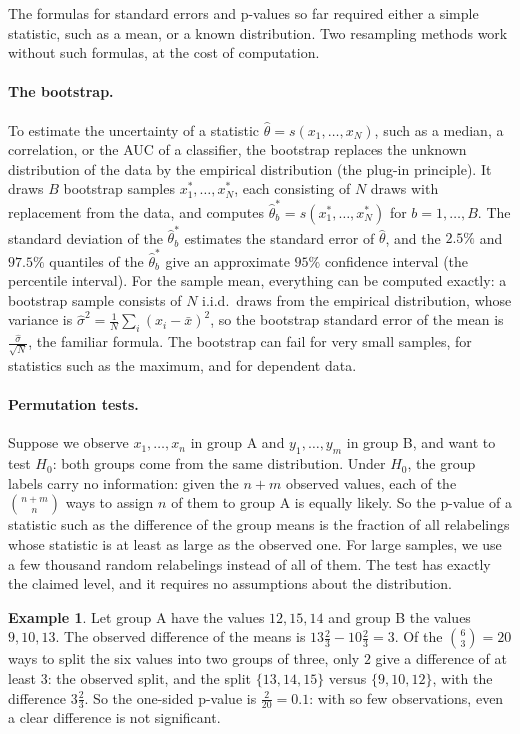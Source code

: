 \documentclass[11pt]{article}
\theoremstyle{definition}
\newtheorem{example}[definition]{Example}
\theoremstyle{plain}
\theoremstyle{remark}
\begin{document}
The formulas for standard errors and p-values so far required either a simple statistic, such as a mean, or a known distribution. Two resampling methods work without such formulas, at the cost of computation.

\paragraph{The bootstrap.} To estimate the uncertainty of a statistic $\hat\theta = s(x_1, \ldots, x_N)$, such as a median, a correlation, or the AUC of a classifier, the bootstrap replaces the unknown distribution of the data by the empirical distribution (the plug-in principle). It draws $B$ bootstrap samples $x_1^*, \ldots, x_N^*$, each consisting of $N$ draws with replacement from the data, and computes $\hat\theta_b^* = s(x_1^*, \ldots, x_N^*)$ for $b = 1, \ldots, B$. The standard deviation of the $\hat\theta_b^*$ estimates the standard error of $\hat\theta$, and the $2.5\%$ and $97.5\%$ quantiles of the $\hat\theta_b^*$ give an approximate $95\%$ confidence interval (the percentile interval). For the sample mean, everything can be computed exactly: a bootstrap sample consists of $N$ i.i.d.\ draws from the empirical distribution, whose variance is $\hat\sigma^2 = \frac{1}{N}\sum_i (x_i - \bar x)^2$, so the bootstrap standard error of the mean is $\frac{\hat\sigma}{\sqrt{N}}$, the familiar formula. The bootstrap can fail for very small samples, for statistics such as the maximum, and for dependent data.

\paragraph{Permutation tests.} Suppose we observe $x_1, \ldots, x_n$ in group A and $y_1, \ldots, y_m$ in group B, and want to test $H_0$: both groups come from the same distribution. Under $H_0$, the group labels carry no information: given the $n + m$ observed values, each of the $\binom{n + m}{n}$ ways to assign $n$ of them to group A is equally likely. So the p-value of a statistic such as the difference of the group means is the fraction of all relabelings whose statistic is at least as large as the observed one. For large samples, we use a few thousand random relabelings instead of all of them. The test has exactly the claimed level, and it requires no assumptions about the distribution.

\begin{example}\label{ex:permutation}
    Let group A have the values $12, 15, 14$ and group B the values $9, 10, 13$. The observed difference of the means is $13\frac{2}{3} - 10\frac{2}{3} = 3$. Of the $\binom{6}{3} = 20$ ways to split the six values into two groups of three, only $2$ give a difference of at least $3$: the observed split, and the split $\{13, 14, 15\}$ versus $\{9, 10, 12\}$, with the difference $3\frac{2}{3}$. So the one-sided p-value is $\frac{2}{20} = 0.1$: with so few observations, even a clear difference is not significant.
\end{example}
\end{document}

